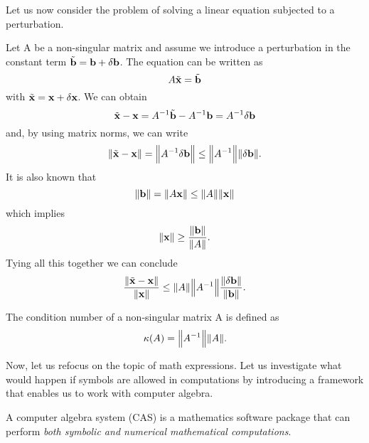 Let us now consider the problem of solving a linear equation subjected to a perturbation.

Let A be a non-singular matrix and assume we introduce a perturbation in the constant term
\(\tilde{\vb{b}} = \vb{b} +  \delta \vb{b}\). The equation can be written as
\[
    A\tilde{\vb{x}} = \tilde{\vb{b}}
\]
with \(\tilde{\vb{x}} = \vb{x} + \delta \vb{x}\). We can obtain
\[
    \tilde{\vb{x}} - \vb{x} = A^{-1} \tilde{\vb{b}} - A^{-1} \vb{b} = A^{-1} \delta \vb{b}
\]
and, by using matrix norms, we can write
\[
    \norm{\tilde{\vb{x}} - \vb{x}} = \norm{A^{-1} \delta \vb{b}} \leq \norm{A^{-1}} \norm{\delta \vb{b}}.
\]
It is also known that
\[
    \norm{\vb{b}} = \norm{A \vb{x}} \leq \norm{A} \norm{\vb{x}}
\]
which implies
\[
    \norm{\vb{x}} \geq \dfrac{\norm{\vb{b}}}{\norm{A}}.
\]
Tying all this together we can conclude
\[
    \dfrac{\norm{\tilde{\vb{x}} - \vb{x}}}{\norm{\vb{x}}} \leq \norm{A} \norm{A^{-1}}
    \dfrac{\norm{\delta \vb{b}}}{\norm{\vb{b}}}.
\]

\begin{definition}\cite[p. 36]{numerical-mathematics}
    The condition number of a non-singular matrix A is defined as
    \[
        \kappa(A) = \norm{A^{-1}} \norm{A}.
    \]
\end{definition}

Now, let us refocus on the topic of math expressions.
Let us investigate what would happen if symbols are allowed in computations by introducing a framework that enables
us to work with computer algebra.
\begin{definition}
    A computer algebra system (CAS) is a mathematics software package that can perform \textit{both symbolic and numerical
    mathematical computations}.
\end{definition}

